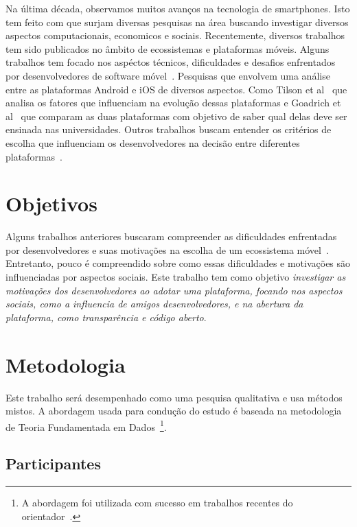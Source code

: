 \documentclass[conference]{IEEEtran}
\begin{document}
Na última década, observamos muitos avanços na tecnologia de smartphones. Isto tem feito com que surjam diversas pesquisas na área buscando investigar diversos aspectos computacionais, economicos e sociais. Recentemente, diversos trabalhos tem sido publicados no âmbito de ecossistemas e plataformas móveis. Alguns trabalhos tem focado nos aspéctos técnicos, dificuldades e desafios enfrentados por desenvolvedores de software móvel~\cite{Joorabchi2013}. Pesquisas que envolvem uma análise entre as plataformas Android e iOS de diversos aspectos. Como Tilson et al~\cite{Tilson2012} que analisa os fatores que influenciam na evolução dessas plataformas e Goadrich et al~\cite{Goadrich2011} que comparam as duas plataformas com objetivo de saber qual delas deve ser ensinada nas universidades. Outros trabalhos buscam entender os critérios de escolha que influenciam os desenvolvedores na decisão entre diferentes plataformas~\cite{Koch2014}.

\section{Objetivos}

Alguns trabalhos anteriores buscaram compreender as dificuldades enfrentadas por desenvolvedores e suas motivações na escolha de um ecossistema móvel~\cite{Joorabchi2013,Koch2014}. Entretanto, pouco é compreendido sobre como essas dificuldades e motivações são influenciadas por aspectos sociais. Este trabalho tem como objetivo \emph{investigar as motivações dos desenvolvedores ao adotar uma plataforma, focando nos aspectos sociais, como a influencia de amigos desenvolvedores, e na abertura da plataforma, como transparência e código aberto}. 

\section{Metodologia}

Este trabalho será desempenhado como uma pesquisa qualitativa e usa métodos mistos. A abordagem usada para condução do estudo é baseada na metodologia de Teoria Fundamentada em Dados~\cite{Corbin2008}\footnote{A abordagem foi utilizada com sucesso em trabalhos recentes do orientador~\cite{Singer2013, Pham2012}.}.

\subsection{Participantes}
\end{document}

